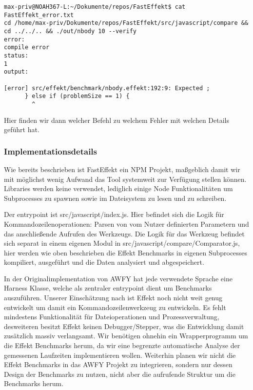 \begin{lstlisting}
max-priv@NOAH367-L:~/Dokumente/repos/FastEffekt$ cat FastEffekt_error.txt 
cd /home/max-priv/Dokumente/repos/FastEffekt/src/javascript/compare && cd ../../.. && ./out/nbody 10 --verify 
error:
compile error
status:
1
output:

[error] src/effekt/benchmark/nbody.effekt:192:9: Expected ;
      } else if (problemSize == 1) {
        ^
\end{lstlisting}
Hier finden wir dann welcher Befehl zu welchem Fehler mit welchen Details geführt hat.

\subsubsection{Implementationsdetails}
Wie bereits beschrieben ist FastEffekt ein NPM Projekt, maßgeblich damit wir mit möglichst wenig Aufwand das Tool systemweit zur Verfügung stellen können.
Libraries werden keine verwendet, lediglich einige Node Funktionalitäten um Subprocesses zu spawnen sowie im Dateisystem zu lesen und zu schreiben.

Der entrypoint ist src/javascript/index.js. Hier befindet sich die Logik für Kommandozeilenoperationen: Parsen von vom Nutzer definierten Parametern und das anschließende Aufrufen des Werkzeugs.
Die Logik für das Werkzeug befindet sich separat in einem eigenen Modul in src/javascript/compare/Comparator.js, hier werden wie oben beschrieben die Effekt Benchmarks in eigenen Subprocesses kompiliert, ausgeführt und die Daten analysiert und abgespeichert.

In der Originalimplementation von AWFY hat jede verwendete Sprache eine Harness Klasse, welche als zentraler entrypoint dient um Benchmarks auszuführen.
Unserer Einschätzung nach ist Effekt noch nicht weit genug entwickelt um damit ein Kommandozeilenwerkzeug zu entwickeln. Es fehlt mindestens Funktionalität für Dateioperationen und Prozessverwaltung, desweiteren besitzt Effekt keinen Debugger/Stepper, was die Entwicklung damit zusätzlich massiv verlangsamt. Wir benötigen ohnehin ein Wrapperprogramm um die Effekt Benchmarks herum, da wir eine begrenzte automatische Analyse der gemessenen Laufzeiten implementieren wollen. Weiterhin planen wir nicht die Effekt Benchmarks in das AWFY Projekt zu integrieren, sondern nur dessen Design der Benchmarks zu nutzen, nicht aber die aufrufende Struktur um die Benchmarks herum.

